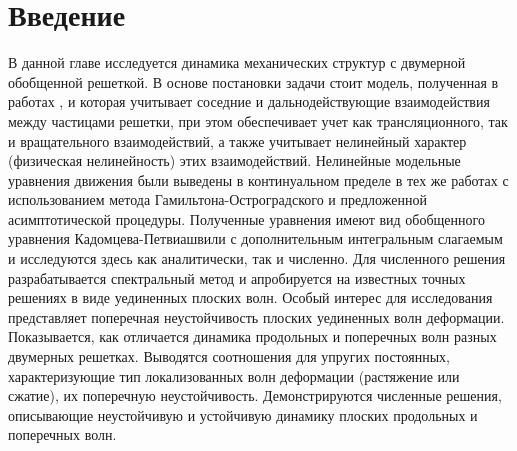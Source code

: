 	
\section{Введение}



В данной главе исследуется динамика механических структур с двумерной обобщенной решеткой. В основе постановки задачи стоит модель, полученная в работах \cite{porkros, PorOsAnt2020}, и которая учитывает соседние и дальнодействующие взаимодействия между частицами решетки, при этом обеспечивает учет как трансляционного, так и вращательного взаимодействий, а также учитывает нелинейный характер (физическая нелинейность) этих взаимодействий. Нелинейные модельные уравнения движения были выведены в континуальном пределе в тех же работах с использованием метода Гамильтона-Остроградского и предложенной асимптотической процедуры. Полученные уравнения имеют вид обобщенного уравнения Кадомцева-Петвиашвили с дополнительным интегральным слагаемым и исследуются здесь как аналитически, так и численно. Для численного решения разрабатывается спектральный метод и апробируется на известных точных решениях в виде уединенных плоских волн. Особый интерес для исследования представляет поперечная неустойчивость плоских уединенных волн деформации. Показывается, как отличается динамика продольных и поперечных волн разных двумерных решетках. Выводятся соотношения для упругих постоянных, характеризующие тип локализованных волн деформации (растяжение или сжатие), их поперечную неустойчивость. Демонстрируются численные решения, описывающие неустойчивую и устойчивую динамику плоских продольных и поперечных волн.


